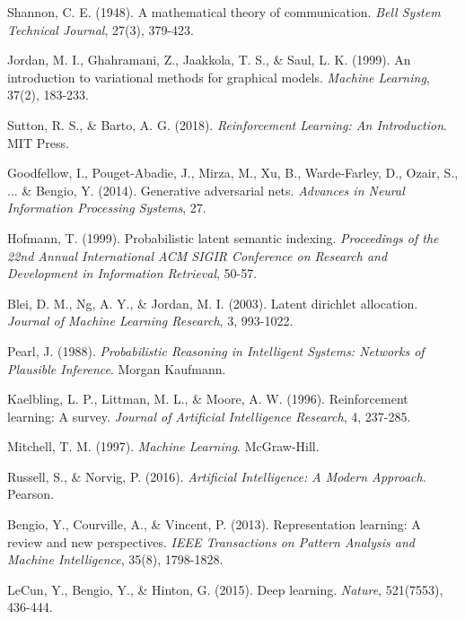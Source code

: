 \documentclass[12pt,a4paper]{article}
\begin{document}

\begin{thebibliography}{99}

Shannon, C. E. (1948). A mathematical theory of communication. \textit{Bell System Technical Journal}, 27(3), 379-423.

Jordan, M. I., Ghahramani, Z., Jaakkola, T. S., \& Saul, L. K. (1999). An introduction to variational methods for graphical models. \textit{Machine Learning}, 37(2), 183-233.

Sutton, R. S., \& Barto, A. G. (2018). \textit{Reinforcement Learning: An Introduction}. MIT Press.

Goodfellow, I., Pouget-Abadie, J., Mirza, M., Xu, B., Warde-Farley, D., Ozair, S., ... \& Bengio, Y. (2014). Generative adversarial nets. \textit{Advances in Neural Information Processing Systems}, 27.

Hofmann, T. (1999). Probabilistic latent semantic indexing. \textit{Proceedings of the 22nd Annual International ACM SIGIR Conference on Research and Development in Information Retrieval}, 50-57.

Blei, D. M., Ng, A. Y., \& Jordan, M. I. (2003). Latent dirichlet allocation. \textit{Journal of Machine Learning Research}, 3, 993-1022.

Pearl, J. (1988). \textit{Probabilistic Reasoning in Intelligent Systems: Networks of Plausible Inference}. Morgan Kaufmann.

Kaelbling, L. P., Littman, M. L., \& Moore, A. W. (1996). Reinforcement learning: A survey. \textit{Journal of Artificial Intelligence Research}, 4, 237-285.

Mitchell, T. M. (1997). \textit{Machine Learning}. McGraw-Hill.

Russell, S., \& Norvig, P. (2016). \textit{Artificial Intelligence: A Modern Approach}. Pearson.

Bengio, Y., Courville, A., \& Vincent, P. (2013). Representation learning: A review and new perspectives. \textit{IEEE Transactions on Pattern Analysis and Machine Intelligence}, 35(8), 1798-1828.

LeCun, Y., Bengio, Y., \& Hinton, G. (2015). Deep learning. \textit{Nature}, 521(7553), 436-444.


\end{thebibliography}
\end{document}
